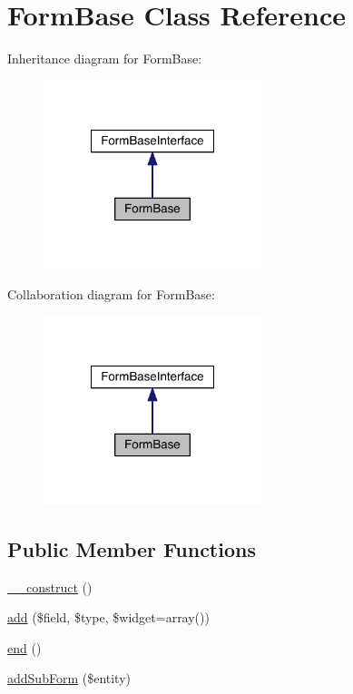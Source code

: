 \hypertarget{classapp_1_1models_1_1core_1_1_form_1_1_form_base}{\section{Form\-Base Class Reference}
\label{classapp_1_1models_1_1core_1_1_form_1_1_form_base}
}


Inheritance diagram for Form\-Base\-:
\nopagebreak
\begin{figure}[H]
\begin{center}
\leavevmode
\includegraphics[width=180pt]{classapp_1_1models_1_1core_1_1_form_1_1_form_base__inherit__graph}
\end{center}
\end{figure}


Collaboration diagram for Form\-Base\-:
\nopagebreak
\begin{figure}[H]
\begin{center}
\leavevmode
\includegraphics[width=180pt]{classapp_1_1models_1_1core_1_1_form_1_1_form_base__coll__graph}
\end{center}
\end{figure}
\subsection*{Public Member Functions}
\begin{DoxyCompactItemize}
\item 
\hyperlink{classapp_1_1models_1_1core_1_1_form_1_1_form_base_a095c5d389db211932136b53f25f39685}{\-\_\-\-\_\-construct} ()
\item 
\hyperlink{classapp_1_1models_1_1core_1_1_form_1_1_form_base_a9246bfd1936d2cd88b799ee29243ff50}{add} (\$field, \$type, \$widget=array())
\item 
\hyperlink{classapp_1_1models_1_1core_1_1_form_1_1_form_base_a817082ace0e2589d27b22890290aa4a9}{end} ()
\item 
\hyperlink{classapp_1_1models_1_1core_1_1_form_1_1_form_base_a5355bf9f755e3555438bd138d43d2055}{add\-Sub\-Form} (\$entity)
\end{DoxyCompactItemize}



